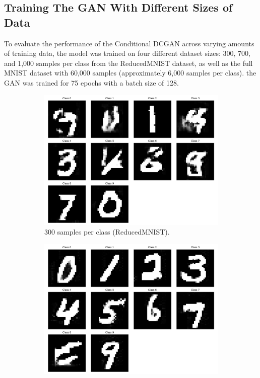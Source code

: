 \documentclass[12pt]{article}
\begin{document}
\subsection{Training The GAN With Different Sizes of Data}
\label{subsec:gan_training_sizes}

To evaluate the performance of the Conditional DCGAN across varying amounts of training data, the model was trained on four different dataset sizes: 300, 700, and 1,000 samples per class from the ReducedMNIST dataset, as well as the full MNIST dataset with 60,000 samples (approximately 6,000 samples per class). the GAN was trained for 75 epochs with a batch size of 128.
\newline



\begin{figure}[h]
    \centering
    \begin{subfigure}[t]{0.45\textwidth}
        \centering
        \includegraphics[width=\textwidth]{300_GAN_output.png}
        \caption{300 samples per class (ReducedMNIST).}
        \label{fig:gan_output_300_sub}
    \end{subfigure}
    \hfill
    \begin{subfigure}[t]{0.45\textwidth}
        \centering
        \includegraphics[width=\textwidth]{700_GAN_output.png}

\end{subfigure}
\end{figure}
\end{document}
